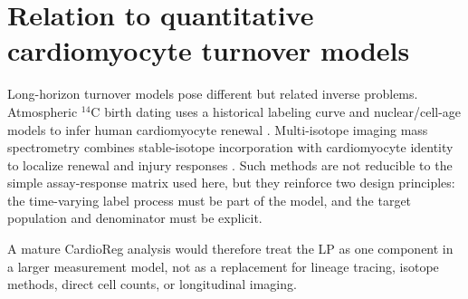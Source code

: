 \documentclass[11pt]{article}
\begin{document}
\section{Relation to quantitative cardiomyocyte turnover models}
Long-horizon turnover models pose different but related inverse problems. Atmospheric $^{14}$C birth dating uses a historical labeling curve and nuclear/cell-age models to infer human cardiomyocyte renewal \citep{Bergmann2009}. Multi-isotope imaging mass spectrometry combines stable-isotope incorporation with cardiomyocyte identity to localize renewal and injury responses \citep{Senyo2013}. Such methods are not reducible to the simple assay-response matrix used here, but they reinforce two design principles: the time-varying label process must be part of the model, and the target population and denominator must be explicit.

A mature CardioReg analysis would therefore treat the LP as one component in a larger measurement model, not as a replacement for lineage tracing, isotope methods, direct cell counts, or longitudinal imaging.
\end{document}
